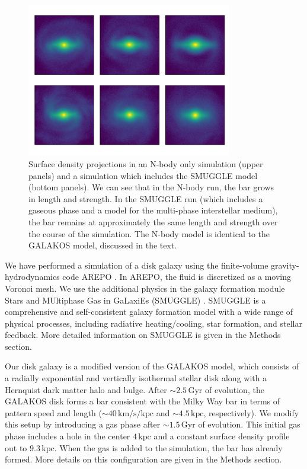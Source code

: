 \documentclass{natureprintstyle}
\begin{document}
\vspace{1cm}


\begin{figure}[b!]%
\centering
\includegraphics[width=0.8\textwidth]{fig/fig1.pdf}
\caption{Surface density projections in an N-body only simulation (upper
panels) and a simulation which includes the SMUGGLE model (bottom panels). We
can see that in the N-body run, the bar grows in length and strength. In the
SMUGGLE run (which includes a gaseous phase and a model for the multi-phase
interstellar medium), the bar remains at approximately the same length and
strength over the course of the simulation. The N-body model is identical to
the GALAKOS model, discussed in the text.}\label{fig:overview}
\end{figure}

We have performed a simulation of a disk galaxy using the finite-volume
gravity-hydrodynamics code AREPO \cite{2010MNRAS.401..791S}. In AREPO, the
fluid is discretized as a moving Voronoi mesh. We use the additional physics
in the galaxy formation module Stars and MUltiphase Gas in GaLaxiEs (SMUGGLE)
\cite{2019MNRAS.489.4233M}. SMUGGLE is a comprehensive and self-consistent
galaxy formation model with a wide range of physical processes, including
radiative heating/cooling, star formation, and stellar feedback. More detailed
information on SMUGGLE is given in the Methods section.

Our disk galaxy is a modified version of the GALAKOS
model\cite{2020ApJ...890..117D}, which consists of a radially exponential and
vertically isothermal stellar disk along with a
Hernquist\cite{1990ApJ...356..359H} dark matter halo and bulge. After
$\sim2.5\,\textrm{Gyr}$ of evolution, the GALAKOS disk forms a bar consistent
with the Milky Way bar in terms of pattern speed and length
($\sim40\,\textrm{km}/\textrm{s}/\textrm{kpc}$ and $\sim4.5\,\textrm{kpc}$,
respectively). We modify this setup by introducing a gas phase after $\sim
1.5\,\textrm{Gyr}$ of evolution. This initial gas phase includes a hole in the
center $4\,\textrm{kpc}$ and a constant surface density profile out to
$9.3\,\textrm{kpc}$. When the gas is added to the simulation, the bar has
already formed. More details on this configuration are given in the Methods
section.
\end{document}
